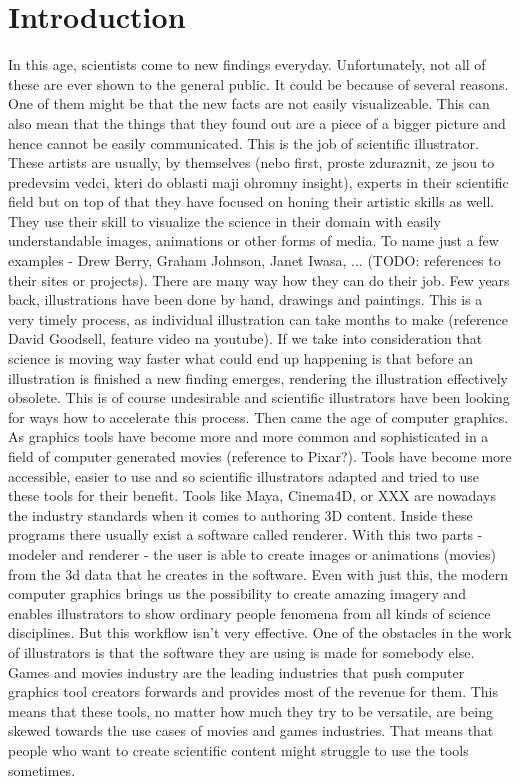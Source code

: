 \documentclass[
  digital, %
  table,   %
  lof,     %
  lot,     %
]{fithesis3}
\begin{document}
\chapter{Introduction}
In this age, scientists come to new findings everyday. Unfortunately, not all of these are ever shown to the general public. It could be because of several reasons. One of them might be that the new facts are not easily visualizeable. This can also mean that the things that they found out are a piece of a bigger picture and hence cannot be easily communicated.
This is the job of scientific illustrator. These artists are usually, by themselves (nebo first, proste zduraznit, ze jsou to predevsim vedci, kteri do oblasti maji ohromny insight), experts in their scientific field but on top of that they have focused on honing their artistic skills as well. They use their skill to visualize the science in their domain with easily understandable images, animations or other forms of media. To name just a few examples - Drew Berry, Graham Johnson, Janet Iwasa, ... (TODO: references to their sites or projects).
There are many way how they can do their job. Few years back, illustrations have been done by hand, drawings and paintings. This is a very timely process, as individual illustration can take months to make (reference David Goodsell, feature video na youtube). If we take into consideration that science is moving way faster what could end up happening is that before an illustration is finished a new finding emerges, rendering the illustration effectively obsolete. This is of course undesirable and scientific illustrators have been looking for ways how to accelerate this process.
Then came the age of computer graphics. As graphics tools have become more and more common and sophisticated in a field of computer generated movies (reference to Pixar?). Tools have become more accessible, easier to use and so scientific illustrators adapted and tried to use these tools for their benefit. Tools like Maya, Cinema4D, or XXX are nowadays the industry standards when it comes to authoring 3D content. Inside these programs there usually exist a software called renderer. With this two parts - modeler and renderer - the user is able to create images or animations (movies) from the 3d data that he creates in the software.
Even with just this, the modern computer graphics brings us the possibility to create amazing imagery and enables illustrators to show ordinary people fenomena from all kinds of science disciplines.
But this workflow isn't very effective. One of the obstacles in the work of illustrators is that the software they are using is made for somebody else. Games and movies industry are the leading industries that push computer graphics tool creators forwards and provides most of the revenue for them. This means that these tools, no matter how much they try to be versatile, are being skewed towards the use cases of movies and games industries. That means that people who want to create scientific content might struggle to use the tools sometimes.
\end{document}
